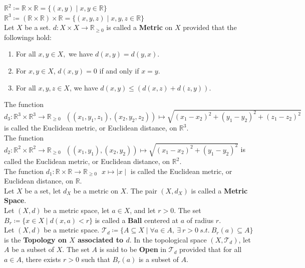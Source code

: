 \documentclass[11pt]{article}
\newcommand{\R}{\mathbb{R}}
\newcommand{\T}{\mathcal{T}}
\begin{document}
		\noindent $\R^2 \coloneqq \R \times \R = \{ (x,y) \mid x,y \in \R \}$\\
		$\R^3 \coloneqq (\R \times \R) \times \R = \{ (x,y,z) \mid x,y,z \in \R \}$\\
		
		\noindent Let $X$ be a set. $d:X \times X \to \R_{\geq 0}$ is called a \textbf{Metric} on $X$ provided that the followings hold:
		\begin{enumerate}[topsep=3pt,itemsep=-1ex,partopsep=1ex,parsep=1ex]
			\item For all  $x,y \in X,$ we have $d(x,y)=d(y,x)$.
			\item For $x,y \in X$, $d(x,y)=0$ if and only if $x=y$.
			\item For all $x,y,z \in X$, we have $d(x,y)\leq (d(x,z)+d(z,y))$.
		\end{enumerate}
		
		\hfill\break
		\noindent The function $d_3: \R^3 \times \R^3 \to \R_{\geq 0} \ \ \ ((x_1,y_1,z_1),(x_2,y_2,z_2)) \mapsto \sqrt{(x_1-x_2)^2+(y_1-y_2)^2+(z_1-z_2)^2}$ is called the Euclidean metric, or Euclidean distance, on $\R^3$.\\ The function $d_2: \R^2 \times \R^2 \to \R_{\geq 0} \ \ \ ((x_1,y_1),(x_2,y_2)) \mapsto \sqrt{(x_1-x_2)^2+(y_1-y_2)^2}$ is called the Euclidean metric, or Euclidean distance, on $\R^2$.\\ The function $d_1:\R \times \R \to \R_{\geq 0} \ \ \ x \mapsto \mid x \mid$ is called the Euclidean metric, or Euclidean distance, on $\R$.\\
				
		\noindent Let $X$ be a set, let $d_X$ be a metric on $X$. The pair $(X,d_X)$ is called a \textbf{Metric Space}.\\				

		\noindent Let $(X,d)$ be a metric space, let $a \in X$, and let $r>0$. The set $B_r \coloneqq \{ x \in X \mid d(x,a)<r \} $ is called a \textbf{Ball} centered at $a$ of radius $r$.\\ 
		
		\noindent Let $(X,d)$ be a metric space. $\T_d \coloneqq \{ A \subseteq X \mid \forall a \in A, \ \exists \ r>0 \ s.t. \ B_r(a) \subseteq A \}$ is the \textbf{Topology on $X$ associated to $d$}. In the topological space $(X,\T_d)$, let $A$ be a subset of $X$. The set $A$ is said to be \textbf{Open} in $\T_d$ provided that for all $a \in A$, there exists $r>0$ such that $B_r(a)$ is a subset of $A$.\\
		
\end{document}
